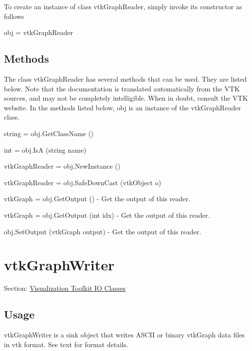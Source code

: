 To create an instance of class vtk\-Graph\-Reader, simply invoke its constructor as follows \begin{DoxyVerb}  obj = vtkGraphReader
\end{DoxyVerb}
 \hypertarget{vtkwidgets_vtkxyplotwidget_Methods}{}\subsection{Methods}\label{vtkwidgets_vtkxyplotwidget_Methods}
The class vtk\-Graph\-Reader has several methods that can be used. They are listed below. Note that the documentation is translated automatically from the V\-T\-K sources, and may not be completely intelligible. When in doubt, consult the V\-T\-K website. In the methods listed below, {\ttfamily obj} is an instance of the vtk\-Graph\-Reader class. 
\begin{DoxyItemize}
\item {\ttfamily string = obj.\-Get\-Class\-Name ()}  
\item {\ttfamily int = obj.\-Is\-A (string name)}  
\item {\ttfamily vtk\-Graph\-Reader = obj.\-New\-Instance ()}  
\item {\ttfamily vtk\-Graph\-Reader = obj.\-Safe\-Down\-Cast (vtk\-Object o)}  
\item {\ttfamily vtk\-Graph = obj.\-Get\-Output ()} -\/ Get the output of this reader.  
\item {\ttfamily vtk\-Graph = obj.\-Get\-Output (int idx)} -\/ Get the output of this reader.  
\item {\ttfamily obj.\-Set\-Output (vtk\-Graph output)} -\/ Get the output of this reader.  
\end{DoxyItemize}\hypertarget{vtkio_vtkgraphwriter}{}\section{vtk\-Graph\-Writer}\label{vtkio_vtkgraphwriter}
Section\-: \hyperlink{sec_vtkio}{Visualization Toolkit I\-O Classes} \hypertarget{vtkwidgets_vtkxyplotwidget_Usage}{}\subsection{Usage}\label{vtkwidgets_vtkxyplotwidget_Usage}
vtk\-Graph\-Writer is a sink object that writes A\-S\-C\-I\-I or binary vtk\-Graph data files in vtk format. See text for format details.

